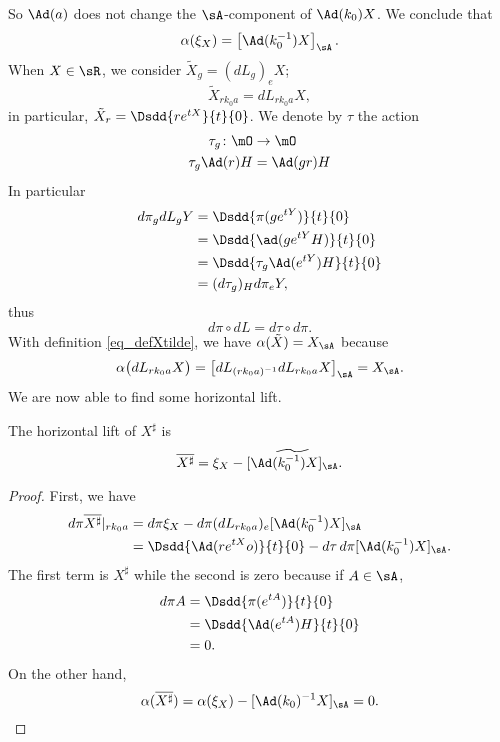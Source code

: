 So $\Ad(a)$ does not change the $\sA$-component of $\Ad(k_0)X$. We conclude that
\begin{equation}
	\alpha(\xi_X)=\left[ \Ad(k_0^{-1})X \right]_{\sA}.
\end{equation}
When $X\in\sR$, we consider $\tilde X_g=(dL_g)_eX$;
\begin{equation}                         \label{eq_defXtilde}
	\tilde X_{rk_0a}=dL_{rk_0a}X,
\end{equation}
in particular, $\tilde X_r=\Dsdd{ r e^{tX} }{t}{0}$.
We denote by $\tau$ the action
\begin{equation}
	\begin{aligned}
		\tau_g\colon\mO & \to \mO    \\
		\tau_g\Ad(r)H   & = \Ad(gr)H
	\end{aligned}
\end{equation}
In particular
\[
	\begin{split}
		d\pi_gdL_g Y&=\Dsdd{ \pi(g e^{tY}) }{t}{0}\\
		&=\Dsdd{ \ad(g e^{tY}H) }{t}{0}\\
		&=\Dsdd{ \tau_g\Ad( e^{tY})H }{t}{0}\\
		&=(d\tau_g)_Hd\pi_e Y,
	\end{split}
\]
thus
\begin{equation}
	d\pi\circ dL = d\tau\circ d\pi.
\end{equation}
With definition \eqref{eq_defXtilde}, we have $\alpha(\tilde X)=X_{\sA}$ because
\[
	\alpha\big( dL_{rk_0a}X \big)=\left[ dL_{(rk_0a)^{-1}}dL_{rk_0a}X \right]_{\sA}
	=X_{\sA}.
\]
We are now able to find some horizontal lift.
\begin{proposition}  \label{prop_horliftXdiz}
	The horizontal lift of $X^{\sharp}$ is
	\[
		\overline{ X^{\sharp} }=\xi_X-\widetilde{  [\Ad(k_0^{-1})X]_{\sA}  }.
	\]

\end{proposition}

\begin{proof}
	First, we have
	\[
		\begin{split}
			d\pi\overline{ X^{\sharp} }|_{rk_0a}&=d\pi\xi_X-d\pi(dL_{rk_0a})_e[\Ad(k_0^{-1})X]_{\sA}\\
			&=\Dsdd{ \Ad(r e^{tX}o) }{t}{0}-d\tau\,d\pi[\Ad(k_0^{-1})X]_{\sA}.
		\end{split}
	\]
	The first term is $X^{\sharp}$ while the second is zero because if $A\in\sA$,
	\[
		\begin{split}
			d\pi A&=\Dsdd{ \pi( e^{tA}) }{t}{0}\\
			&=\Dsdd{ \Ad( e^{tA})H }{t}{0}\\
			&=0.
		\end{split}
	\]
	On the other hand,
	\[
		\alpha(\overline{ X^{\sharp} })=\alpha(\xi_X)-[\Ad(k_0)^{-1}X]_{\sA}=0.
	\]
\end{proof}

